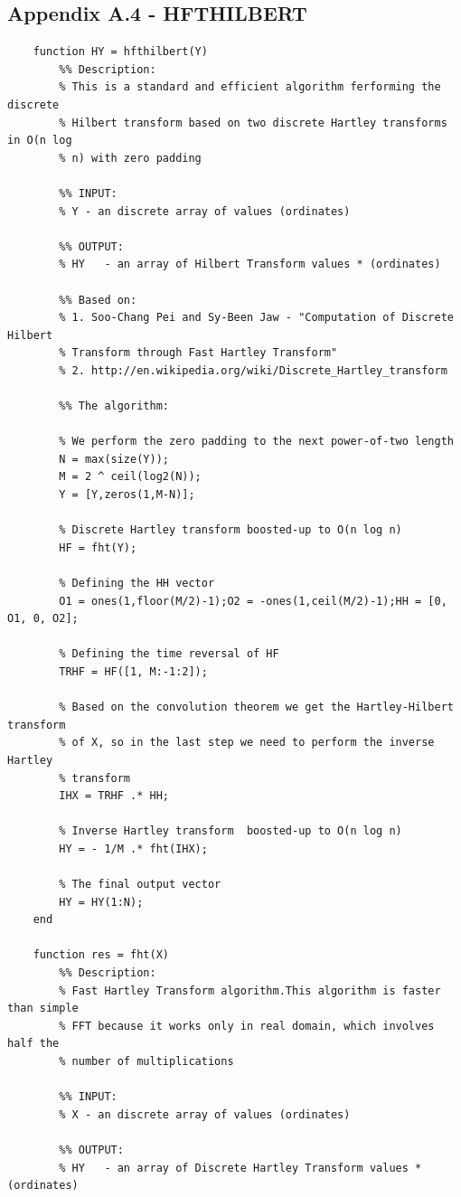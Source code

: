 \documentclass[12pt,twoside,a4paper]{article}
\numberwithin{equation}{subsection}
\numberwithin{figure}{subsection}
\begin{document}
\subsection*{Appendix A.4 - HFTHILBERT}
\begin{lstlisting}
	function HY = hfthilbert(Y)
	    %% Description:
	    % This is a standard and efficient algorithm ferforming the discrete
	    % Hilbert transform based on two discrete Hartley transforms in O(n log
	    % n) with zero padding
	   
	    %% INPUT:
	    % Y - an discrete array of values (ordinates)
	    
	    %% OUTPUT:
	    % HY   - an array of Hilbert Transform values * (ordinates)
	    
	    %% Based on:
	    % 1. Soo-Chang Pei and Sy-Been Jaw - "Computation of Discrete Hilbert
	    % Transform through Fast Hartley Transform"
	    % 2. http://en.wikipedia.org/wiki/Discrete_Hartley_transform
	   
	    %% The algorithm:
	        
	    % We perform the zero padding to the next power-of-two length
	    N = max(size(Y));
	    M = 2 ^ ceil(log2(N));
	    Y = [Y,zeros(1,M-N)];
	    
	    % Discrete Hartley transform boosted-up to O(n log n)
	    HF = fht(Y);
	    
	    % Defining the HH vector
	    O1 = ones(1,floor(M/2)-1);O2 = -ones(1,ceil(M/2)-1);HH = [0, O1, 0, O2];
	    
	    % Defining the time reversal of HF
	    TRHF = HF([1, M:-1:2]);
	    
	    % Based on the convolution theorem we get the Hartley-Hilbert transform
	    % of X, so in the last step we need to perform the inverse Hartley
	    % transform
	    IHX = TRHF .* HH;
	    
	    % Inverse Hartley transform  boosted-up to O(n log n)
	    HY = - 1/M .* fht(IHX);
	    
	    % The final output vector
	    HY = HY(1:N);
	end

	function res = fht(X)
	    %% Description:
	    % Fast Hartley Transform algorithm.This algorithm is faster than simple 
	    % FFT because it works only in real domain, which involves half the 
	    % number of multiplications
	      
	    %% INPUT:
	    % X - an discrete array of values (ordinates)
	    
	    %% OUTPUT:
	    % HY   - an array of Discrete Hartley Transform values * (ordinates)
	    

\end{lstlisting}
\end{document}
